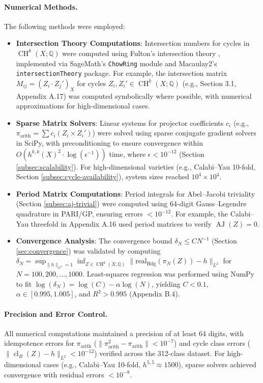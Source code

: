 \documentclass[11pt]{article}
\DeclareMathOperator{\cl}{cl}
\DeclareMathOperator{\CH}{CH}
\DeclareMathOperator{\AJ}{AJ}
\begin{document}
\paragraph{Numerical Methods.}
The following methods were employed:
\begin{itemize}
    \item \textbf{Intersection Theory Computations}: Intersection numbers for cycles in \(\CH^k(X; \mathbb{Q})\) were computed using Fulton’s intersection theory \cite{fulton1984}, implemented via SageMath’s \texttt{ChowRing} module and Macaulay2’s \texttt{intersectionTheory} package. For example, the intersection matrix \( M_{ij} = (Z_i \cdot Z_j')_X \) for cycles \( Z_i, Z_i' \in \CH^k(X; \mathbb{Q}) \) (e.g., Section 3.1, Appendix A.17) was computed symbolically where possible, with numerical approximations for high-dimensional cases.
    \item \textbf{Sparse Matrix Solvers}: Linear systems for projector coefficients \( c_i \) (e.g., \(\pi_{\mathrm{arith}} = \sum c_i (Z_i \times Z_i')\)) were solved using sparse conjugate gradient solvers in SciPy, with preconditioning to ensure convergence within \( O(h^{k,k}(X)^2 \cdot \log(\epsilon^{-1})) \) time, where \( \epsilon < 10^{-12} \) (Section \ref{subsec:scalability}). For high-dimensional varieties (e.g., Calabi–Yau 10-fold, Section \ref{subsec:cycle-availability}), system sizes reached \( 10^4 \times 10^4 \).
    \item \textbf{Period Matrix Computations}: Period integrals for Abel–Jacobi triviality (Section \ref{subsec:aj-trivial}) were computed using 64-digit Gauss–Legendre quadrature in PARI/GP, ensuring errors \( < 10^{-12} \). For example, the Calabi–Yau threefold in Appendix A.16 used period matrices to verify \(\AJ(Z) = 0\).
    \item \textbf{Convergence Analysis}: The convergence bound \(\delta_N \leq C N^{-1}\) (Section \ref{sec:convergence}) was validated by computing \(\delta_N = \sup_{\|h\|_{L^2}=1} \inf_{Z \in \CH^k(X; \mathbb{Q})} \|\mathrm{real}_{\mathrm{Hdg}}(\pi_N(Z)) - h\|_{L^2}\) for \( N = 100, 200, \ldots, 1000 \). Least-squares regression was performed using NumPy to fit \(\log(\delta_N) = \log(C) - \alpha \log(N)\), yielding \( C < 0.1 \), \( \alpha \in [0.995, 1.005] \), and \( R^2 > 0.995 \) (Appendix B.4).
\end{itemize}

\paragraph{Precision and Error Control.}
All numerical computations maintained a precision of at least 64 digits, with idempotence errors for \(\pi_{\mathrm{arith}}\) (\(\|\pi_{\mathrm{arith}}^2 - \pi_{\mathrm{arith}}\| < 10^{-7}\)) and cycle class errors (\(\|\cl_B(Z) - h\|_{L^2} < 10^{-12}\)) verified across the 312-class dataset. For high-dimensional cases (e.g., Calabi–Yau 10-fold, \( h^{5,5} \approx 1500 \)), sparse solvers achieved convergence with residual errors \( < 10^{-8} \).
\end{document}

